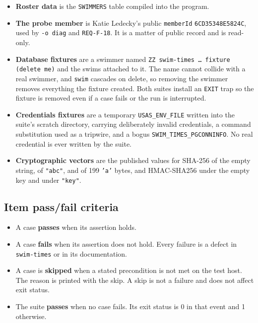 \documentclass[12pt]{article}
\newcommand{\code}[1]{\texttt{#1}}
\newcommand{\req}[1]{\texttt{#1}}
\begin{document}
\begin{itemize}
  \item \textbf{Roster data} is the \code{SWIMMERS} table compiled into
        the program.
  \item \textbf{The probe member} is Katie Ledecky's public
        \code{memberId} \code{6CD35348E5824C}, used by \code{-o diag}
        and \req{REQ-F-18}.  It is a matter of public record and is
        read-only.
  \item \textbf{Database fixtures} are a swimmer named
        \code{ZZ swim-times \dots{} fixture (delete me)} and the swims
        attached to it.  The name cannot collide with a real swimmer,
        and \code{swim} cascades on delete, so removing the swimmer
        removes everything the fixture created.  Both suites install an
        \code{EXIT} trap so the fixture is removed even if a case fails
        or the run is interrupted.
  \item \textbf{Credentials fixtures} are a temporary
        \code{USAS\_ENV\_FILE} written into the suite's scratch
        directory, carrying deliberately invalid credentials, a command
        substitution used as a tripwire, and a bogus
        \code{SWIM\_TIMES\_PGCONNINFO}.  No real credential is ever
        written by the suite.
  \item \textbf{Cryptographic vectors} are the published values for
        SHA-256 of the empty string, of \code{"abc"}, and of 199
        \code{'a'} bytes, and HMAC-SHA256 under the empty key and under
        \code{"key"}.
\end{itemize}

\subsection{Item pass/fail criteria}

\begin{itemize}
  \item A case \textbf{passes} when its assertion holds.
  \item A case \textbf{fails} when its assertion does not hold.  Every
        failure is a defect in \code{swim-times} or in its
        documentation.
  \item A case is \textbf{skipped} when a stated precondition is not
        met on the test host.  The reason is printed with the skip.  A
        skip is not a failure and does not affect exit status.
  \item The suite \textbf{passes} when no case fails.  Its exit status
        is 0 in that event and 1 otherwise.
\end{itemize}
\end{document}
